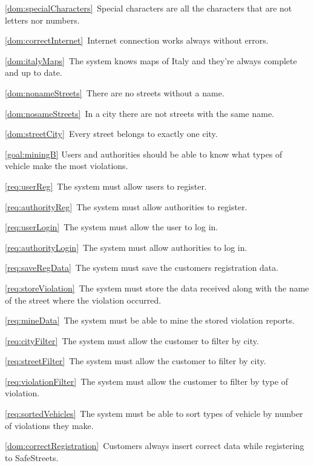 \begin{description}
\begin{description}
\begin{description}
							\item \ref{dom:specialCharacters}\ Special characters are all the characters that are not letters nor numbers.
							\item \ref{dom:correctInternet}\ Internet connection works always without errors.
							\item \ref{dom:italyMaps}\ The system knows maps of Italy and they’re always complete and up to date.
							\item \ref{dom:nonameStreets}\ There are no streets without a name.
							\item \ref{dom:nosameStreets}\ In a city there are not streets with the same name.
							\item \ref{dom:streetCity}\ Every street belongs to exactly one city.
						\end{description}
					\item \ref{goal:miningB} Users and authorities should be able to know what types of vehicle make the most violations.
						\begin{description}
							\item \ref{req:userReg}\ The system must allow users to register.
							\item \ref{req:authorityReg}\ The system must allow authorities to register.
							\item \ref{req:userLogin}\ The system must allow the user to log in.
							\item \ref{req:authorityLogin}\ The system must allow authorities to log in.
							\item \ref{req:saveRegData}\ The system must save the customers registration data.
							\item \ref{req:storeViolation}\ The system must store the data received along with the name of the street where the violation occurred.
							\item \ref{req:mineData}\ The system must be able to mine the stored violation reports.
							\item \ref{req:cityFilter}\ The system must allow the customer to filter by city.
							\item \ref{req:streetFilter}\ The system must allow the customer to filter by city.
							\item \ref{req:violationFilter}\ The system must allow the customer to filter by type of violation.
							\item \ref{req:sortedVehicles}\ The system must be able to sort types of vehicle by number of violations they make.
							\item \ref{dom:correctRegistration}\ Customers always insert correct data while registering to SafeStreets.

\end{description}
\end{description}
\end{description}
